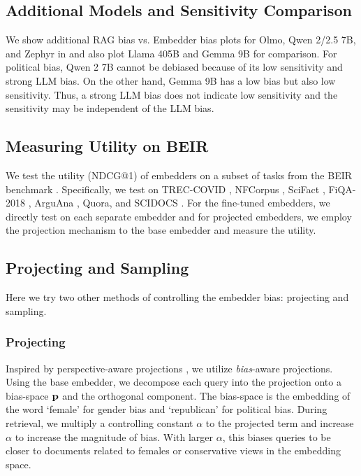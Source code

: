 \subsection{Additional Models and Sensitivity Comparison}
\label{app:more-models}
We show additional RAG bias vs. Embedder bias plots for Olmo, Qwen 2/2.5 7B, and Zephyr in  and also plot Llama 405B and Gemma 9B for comparison. For political bias, Qwen 2 7B cannot be debiased because of its low sensitivity and strong LLM bias. On the other hand, Gemma 9B has a low bias but also low sensitivity. Thus, a strong LLM bias does not indicate low sensitivity and the sensitivity may be independent of the LLM bias.

\subsection{Measuring Utility on BEIR}
\label{app:beir}
We test the utility (NDCG@1) of embedders on a subset of tasks from the BEIR benchmark \citep{thakur2021beir}. Specifically, we test on TREC-COVID \citep{voorhees2021trec}, NFCorpus \citep{boteva2016full}, SciFact \citep{wadden2020fact}, FiQA-2018 \citep{maia201818}, ArguAna \citep{wachsmuth2018retrieval}, Quora, and SCIDOCS \citep{cohan2004specter}. For the fine-tuned embedders, we directly test on each separate embedder and for projected embedders, we employ the projection mechanism to the base embedder and measure the utility. 


\subsection{Projecting and Sampling}
\label{app:proj-samp}
Here we try two other methods of controlling the embedder bias: projecting and sampling.
\subsubsection{Projecting}
Inspired by perspective-aware projections \citep{zhao2024beyond}, we utilize \emph{bias}-aware projections. Using the base embedder, we decompose each query into the projection onto a bias-space $\mathbf{p}$ and the orthogonal component. The bias-space is the embedding of the word `female' for gender bias and `republican' for political bias. During retrieval, we multiply a controlling constant $\alpha$ to the projected term and increase $\alpha$ to increase the magnitude of bias. With larger $\alpha$, this biases queries to be closer to documents related to females or conservative views in the embedding space.

